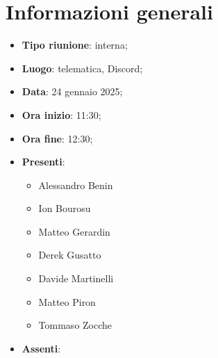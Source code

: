 \section{Informazioni generali}
\begin{itemize}
  \item \textbf{Tipo riunione}: interna;
  \item \textbf{Luogo}: telematica, Discord;
  \item \textbf{Data}: 24 gennaio 2025;
  \item \textbf{Ora inizio}: 11:30;
  \item \textbf{Ora fine}: 12:30;
  
  \item \textbf{Presenti}:
  \begin{itemize}
    \item Alessandro Benin
    \item Ion Bourosu
    \item Matteo Gerardin
    \item Derek Gusatto
    \item Davide Martinelli
    \item Matteo Piron
    \item Tommaso Zocche
  \end{itemize}

  \item \textbf{Assenti}:
 
\end{itemize}